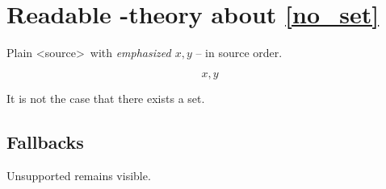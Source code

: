 \section{Readable \in-theory about \cref{no_set}}\label{introduction}

Plain <source>\ with \emph{emphasized $x,y$} -- in source order.

\[
    x,y
\]

\begin{proposition}\label{no_set}
    It is not the case that there exists a set.
\end{proposition}

\subsection{Fallbacks}

Unsupported  remains visible.
